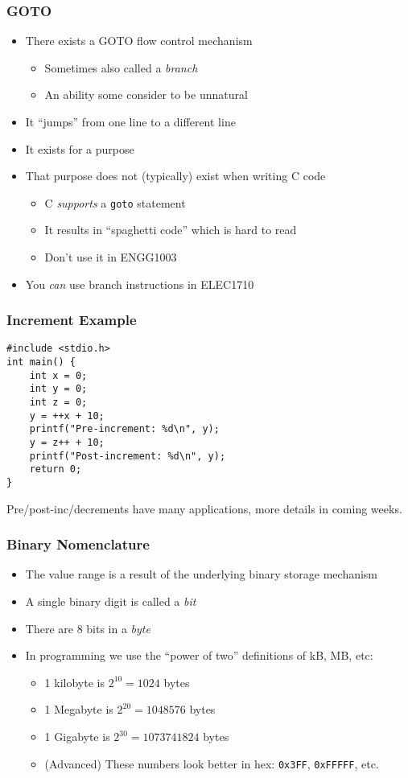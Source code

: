 \documentclass[14pt]{beamer}
\begin{document}
\begin{frame}
\frametitle{GOTO}
\begin{itemize}
\item There exists a GOTO flow control mechanism
	\begin{itemize}
		\item Sometimes also called a \textit{branch}
		\item An ability some consider to be unnatural
	\end{itemize}
\item It ``jumps'' from one line to a different line
\item It exists for a purpose
\item That purpose does not (typically) exist when writing C code
	\begin{itemize}
		\item C \textit{supports} a \texttt{goto} statement
		\item It results in ``spaghetti code'' which is hard to read
		\item Don't use it in ENGG1003
	\end{itemize}
\item You \textit{can} use branch instructions in ELEC1710
\end{itemize}
\end{frame}

\begin{frame}[fragile]
\frametitle{Increment Example}
\begin{lstlisting}[style=CStyle,caption=\texttt{increment.c}]
#include <stdio.h>
int main() {
	int x = 0;
	int y = 0;
	int z = 0;
	y = ++x + 10;
	printf("Pre-increment: %d\n", y);
	y = z++ + 10;
	printf("Post-increment: %d\n", y);
	return 0;
}
\end{lstlisting}
Pre/post-inc/decrements have many applications, more details in coming weeks.
\end{frame}

\begin{frame}
\frametitle{Binary Nomenclature}
\begin{itemize}
\item The value range is a result of the underlying binary storage mechanism
\item A single binary digit is called a \textit{bit}
\item There are 8 bits in a \textit{byte}
\item In programming we use the ``power of two'' definitions of kB, MB, etc:
	\begin{itemize}
		\item 1 kilobyte is $2^{10} = 1024$ bytes
		\item 1 Megabyte is $2^{20} = 1048576$ bytes
		\item 1 Gigabyte is $2^{30} = 1073741824$ bytes
		\item (Advanced) These numbers look better in hex: \texttt{0x3FF}, \texttt{0xFFFFF}, etc.
	\end{itemize}
\end{itemize}
\end{frame}
\end{document}
